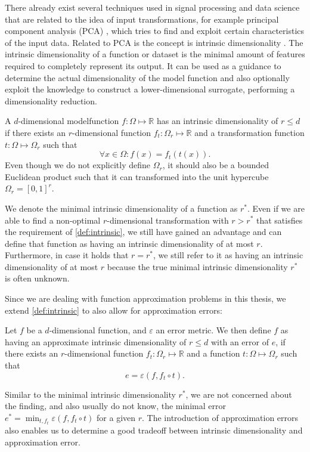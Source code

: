 \documentclass[
  a4paper,  %
  twoside,  %
  bibliography=totoc,
  headsepline,
  cleardoublepage=empty,
  parskip=half,
  draft=false
]{scrbook}
\begin{document}
There already exist several techniques used in signal processing and data science that are related to the idea of input transformations, for example principal component analysis (PCA) \cite{Abdi2010}, which tries to find and exploit certain characteristics of the input data.
Related to PCA is the concept is intrinsic dimensionality \cite{Bennett1969}.
The intrinsic dimensionality of a function or dataset is the minimal amount of features required to completely represent its output.
It can be used as a guidance to determine the actual dimensionality of the model function and also optionally exploit the knowledge to construct a lower-dimensional surrogate, \ie performing a dimensionality reduction.

\begin{definition}
A $d$-dimensional modelfunction $f \colon \Omega \mapsto \mathds{R}$ has an intrinsic dimensionality of $r \leq d$ if there exists an $r$-dimensional function $f_t \colon \Omega_r \mapsto \mathds{R}$ and a transformation function $t \colon \Omega \mapsto \Omega_r$ such that
\begin{equation}
\forall x \in \Omega \colon f(x)=f_t(t(x)).
\end{equation}
\label{def:intrinsic}
Even though we do not explicitly define $\Omega_r$, it should also be a bounded Euclidean product such that it can  transformed into the unit hypercube $\Omega_r=[0,1]^r$.
\end{definition}
%
We denote the minimal intrinsic dimensionality of a function as $r^\ast$.
Even if we are able to find a non-optimal $r$-dimensional transformation with $r > r^\ast$ that satisfies the requirement of \cref{def:intrinsic}, we still have gained an advantage and can define that function as having an intrinsic dimensionality of at most $r$.
Furthermore, in case it holds that $r=r^\ast$, we still refer to it as having an intrinsic dimensionality of at most $r$ because the true minimal intrinsic dimensionality $r^\ast$ is often unknown.

Since we are dealing with function approximation problems in this thesis, we extend \cref{def:intrinsic} to also allow for approximation errors:
\begin{definition}
Let $f$ be a $d$-dimensional function, and $\varepsilon$ an error metric.
We then define $f$ as having an approximate intrinsic dimensionality of $r \leq d$ with an error of $e$, if there exists an $r$-dimensional function $f_t \colon \Omega_r \mapsto \mathds{R}$ and a function $t \colon \Omega \mapsto \Omega_r$ such that
\begin{equation}
e=\varepsilon\left(f,  f_t \circ t\right).
\end{equation}
\end{definition}
%
Similar to the minimal intrinsic dimensionality $r^\ast$, we are not concerned about the finding, and also usually do not know, the minimal error $e^\ast=\min_{t, f_t} \varepsilon\left(f,  f_t \circ t\right)$ for a given $r$.
The introduction of approximation errors also enables us to determine a good tradeoff between intrinsic dimensionality and approximation error.
\end{document}
